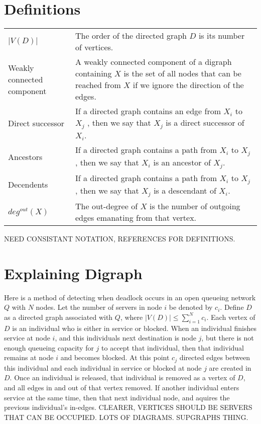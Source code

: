 \documentclass{article}
\begin{document}
\section{Definitions}
\begin{tabular}{ p{5cm} p{10cm} }
  $\left| V(D) \right|$ & The order of the directed graph $D$ is its number of vertices. \\
  Weakly connected component & A weakly connected component of a digraph containing $X$ is the set of all nodes that can be reached from $X$ if we ignore the direction of the edges. \\
  Direct successor & If a directed graph contains an edge from $X_i$ to $X_j$ , then we say that $X_j$ is a direct successor of $X_i$. \\
  Ancestors & If a directed graph contains a path from $X_i$ to $X_j$ , then we say that $X_i$ is an ancestor of $X_j$. \\
  Decendents & If a directed graph contains a path from $X_i$ to $X_j$ , then we say that $X_j$ is a descendant of $X_i$. \\
  $deg^{out}(X)$ & The out-degree of $X$ is the number of outgoing edges emanating from that vertex. \\
\end{tabular}
\newline
NEED CONSISTANT NOTATION, REFERENCES FOR DEFINITIONS.

\section{Explaining Digraph}
Here is a method of detecting when deadlock occurs in an open queueing network $Q$ with $N$ nodes. Let the number of servers in node $i$ be denoted by $c_i$.\newline
Define $D$ as a directed graph associated with $Q$, where $\left| V(D) \right| \leq \sum_{i=1}^N c_i$. Each vertex of $D$ is an individual who is either in service or blocked.\newline
When an individual finishes service at node $i$, and this individuals next destination is node $j$, but there is not enough queueing capacity for $j$ to accept that individual, then that individual remains at node $i$ and becomes blocked. At this point $c_j$ directed edges between this individual and each individual in service or blocked at node $j$ are created in $D$.\newline
Once an individual is released, that individual is removed as a vertex of $D$, and all edges in and out of that vertex removed. If another individual enters service at the same time, then that next individual node, and aquires the previous individual's in-edges.\newline
CLEARER, VERTICES SHOULD BE SERVERS THAT CAN BE OCCUPIED. LOTS OF DIAGRAMS. SUPGRAPHS THING.
\end{document}
